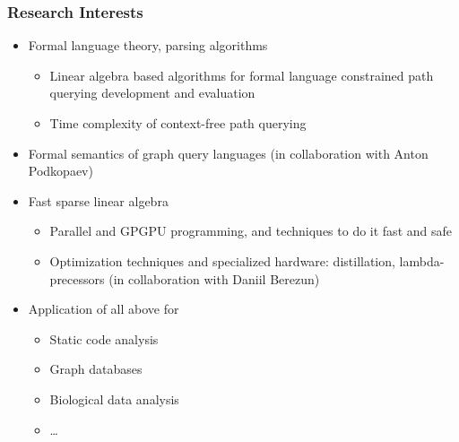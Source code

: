 \documentclass[xcolor=table, aspectratio=169]{beamer}
\begin{document}
\begin{frame}[fragile]

  \frametitle{Research Interests}
\begin{itemize}
      \item Formal language theory, parsing algorithms
      \begin{itemize}
        \item Linear algebra based algorithms for formal language constrained path querying development and evaluation
        \item Time complexity of context-free path querying
      \end{itemize}
      \item Formal semantics of graph query languages (in collaboration with Anton Podkopaev)
      \item Fast sparse linear algebra
      \begin{itemize}
        \item Parallel and GPGPU programming, and techniques to do it fast and safe
        \item Optimization techniques and specialized hardware: distillation, lambda-precessors (in collaboration with Daniil Berezun)
      \end{itemize}
      \item Application of all above for
      \begin{itemize}
        \item Static code analysis
        \item Graph databases
        \item Biological data analysis
        \item \ldots
      \end{itemize}

\end{itemize}

\end{frame}
\end{document}
